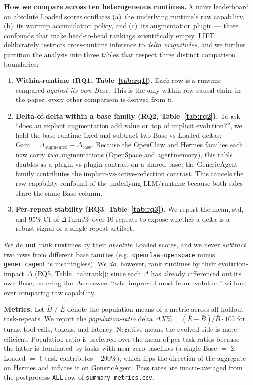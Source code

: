 \documentclass{article}
\begin{document}
\textbf{How we compare across ten heterogeneous runtimes.} A na\"ive leaderboard on absolute Loaded scores conflates (a)~the underlying runtime's raw capability, (b)~its warmup accumulation policy, and (c)~its augmentation plugin --- three confounds that make head-to-head rankings scientifically empty. LIFT deliberately restricts cross-runtime inference to \emph{delta magnitudes}, and we further partition the analysis into three tables that respect three distinct comparison boundaries:
\begin{enumerate}
\item \textbf{Within-runtime (RQ1, Table~\ref{tab:rq1}).} Each row is a runtime compared \emph{against its own Base}. This is the only within-row causal claim in the paper; every other comparison is derived from it.
\item \textbf{Delta-of-delta within a base family (RQ2, Table~\ref{tab:rq2}).} To ask ``does an explicit augmentation add value on top of implicit evolution?'', we hold the base runtime fixed and subtract two Base-vs-Loaded deltas: $\text{Gain} = \Delta_\text{augmented} - \Delta_\text{base}$. Because the OpenClaw and Hermes families each now carry \emph{two} augmentations (OpenSpace and agentmemory), this table doubles as a plugin-vs-plugin contrast on a shared base; the GenericAgent family contributes the implicit-vs-active-reflection contrast. This cancels the raw-capability confound of the underlying LLM/runtime because both sides share the same Base column.
\item \textbf{Per-repeat stability (RQ3, Table~\ref{tab:rq3}).} We report the mean, std, and 95\% CI of $\Delta$Turns\% over 10 repeats to expose whether a delta is a robust signal or a single-repeat artifact.
\end{enumerate}
We do \textbf{not} rank runtimes by their \emph{absolute} Loaded scores, and we never \emph{subtract} two rows from different base families (e.g.\ \texttt{openclaw+openspace} minus \texttt{genericagent} is meaningless). We \emph{do}, however, rank runtimes by their evolution-impact $\Delta$ (RQ5, Table~\ref{tab:rank}): since each $\Delta$ has already differenced out its own Base, ordering the $\Delta$s answers ``who improved most from evolution'' without ever comparing raw capability.

\textbf{Metrics.} Let $\bar{B}$ / $\bar{E}$ denote the population means of a metric across all holdout task-repeats. We report the \emph{population-ratio} delta $\Delta X\% = (\bar{E} - \bar{B}) / \bar{B} \cdot 100$ for turns, tool calls, tokens, and latency. Negative means the evolved side is more efficient. Population ratio is preferred over the mean of per-task ratios because the latter is dominated by tasks with near-zero baselines (a single Base $=$ 2, Loaded $=$ 6 task contributes $+200\%$), which flips the direction of the aggregate on Hermes and inflates it on GenericAgent. Pass rates are macro-averaged from the postprocess \texttt{ALL} row of \texttt{summary\_metrics.csv}.
\end{document}

